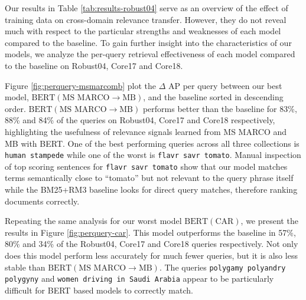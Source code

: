Our results in Table \ref{tab:results-robust04} serve as an overview of the effect of training data on cross-domain relevance transfer.
However, they do not reveal much with respect to the particular strengths and weaknesses of each model compared to the baseline.
To gain further insight into the characteristics of our models, we analyze the per-query retrieval effectiveness of each model compared to the baseline on Robust04, Core17 and Core18.

Figure \ref{fig:perquery-msmarcomb} plot the $\Delta$ AP per query between our best model, $ \textrm{BERT}(\textrm{MS MARCO}\rightarrow\textrm{MB}) $, and the baseline sorted in descending order.
$ \textrm{BERT}(\textrm{MS MARCO}\rightarrow\textrm{MB}) $ performs better than the baseline for 83\%, 88\% and 84\% of the queries on Robust04, Core17 and Core18 respectively, highlighting the usefulness of relevance signals learned from MS MARCO and MB with BERT.
One of the best performing queries across all three collections is \texttt{human stampede} while one of the worst is \texttt{flavr savr tomato}.
Manual inspection of top scoring sentences for \texttt{flavr savr tomato} show that our model matches terms semantically close to ``tomato'' but not relevant to the query phrase itself while the BM25+RM3 baseline looks for direct query matches, therefore ranking documents correctly.

Repeating the same analysis for our worst model $ \textrm{BERT}(\textrm{CAR}) $, we present the results in Figure \ref{fig:perquery-car}.
This model outperforms the baseline in 57\%, 80\% and 34\% of the Robust04, Core17 and Core18 queries respectively.
Not only does this model perform less accurately for much fewer queries, but it is also less stable than $ \textrm{BERT}(\textrm{MS MARCO}\rightarrow\textrm{MB}) $.
The queries \texttt{polygamy polyandry polygyny} and \texttt{women driving in Saudi Arabia} appear to be particularly difficult for BERT based models to correctly match.


